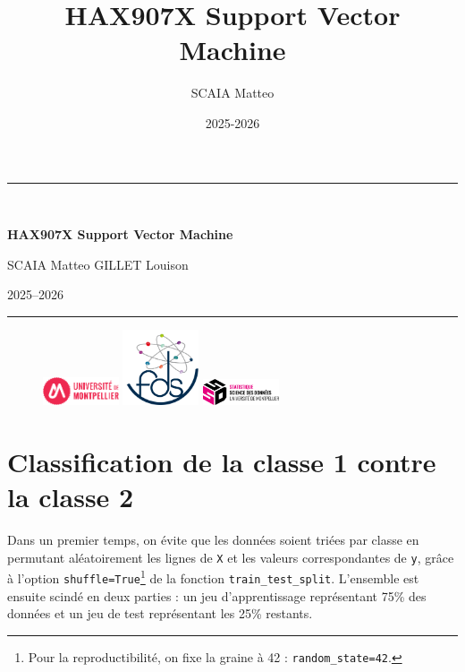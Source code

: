 \documentclass[a4paper,12pt]{article}
\title{\textbf{HAX907X Support Vector Machine}}
\author{{SCAIA Matteo} \qquad {GILLET Louison}}
\date{2025-2026}
\begin{document}
\begin{titlepage}
    \centering
    \vspace*{\fill} %

    \rule{\textwidth}{0.4pt}\\[1cm] %
    {\Huge \textbf{HAX907X Support Vector Machine}\par}
    \vspace{0.5cm}
    {\large SCAIA Matteo \qquad GILLET Louison \par}
    \vspace{0.5cm}
    {\large 2025--2026 \par}
    \rule{\textwidth}{0.4pt} %

    \vspace*{\fill} %

    \begin{figure}[!b] 
        \centering
        \includegraphics[width=0.2\textwidth]{images/logo_um.pdf} \hspace{1cm}
        \includegraphics[width=0.2\textwidth]{images/Faculte-des-Sciences-2022-rond-fond.png} \hspace{1cm}
        \includegraphics[width=0.2\textwidth]{images/ssd_logo_couleur_noir-300x103.png}
    \end{figure}
\end{titlepage}

\newpage
\tableofcontents
\vspace{2cm}
\listoffigures
\newpage

\pagestyle{custom}
\section{Classification de la classe 1 contre la classe 2}

Dans un premier temps, on évite que les données soient triées par classe en 
permutant aléatoirement les lignes de \texttt{X} et les valeurs correspondantes 
de \texttt{y}, grâce à l’option \texttt{shuffle=True}\footnote{Pour la reproductibilité, on fixe la graine à 42 : \texttt{random\_state=42}.} de la fonction 
\texttt{train\_test\_split}. L’ensemble est ensuite scindé en deux parties : 
un jeu d’apprentissage représentant 75\% des données et un jeu de test 
représentant les 25\% restants.
\end{document}
